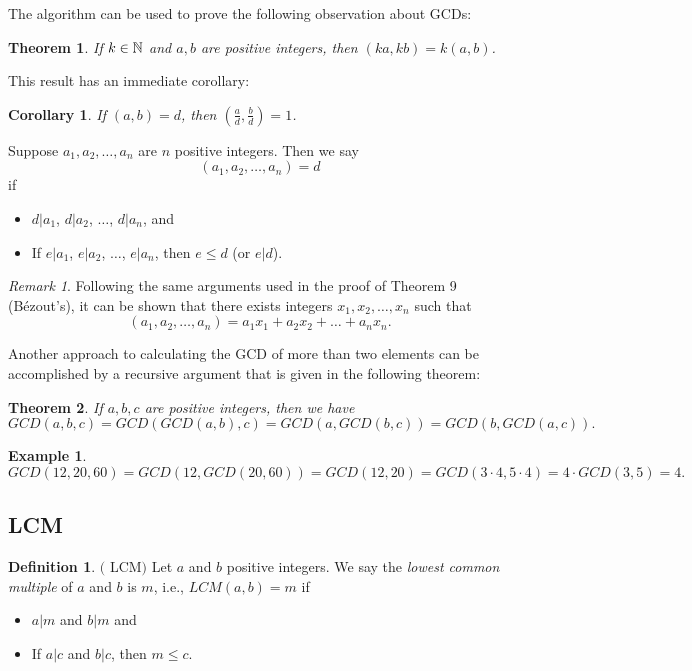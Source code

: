 \documentclass[12pt]{article}
\theoremstyle{plain}
\newtheorem{corollary}{Corollary}
\newtheorem{example}{Example}
\newtheorem{theorem}{Theorem}
\theoremstyle{definition}
\newtheorem{definition}{Definition}
\theoremstyle{remark}
\newtheorem{remark}{Remark}
\begin{document}
\bigskip
The algorithm can be used to prove the following observation about GCDs:
\begin{theorem}\label{factorout}
If $k\in \mathbb{N}$ and $a, b$ are positive integers, then $(ka, kb) = k(a,b)$.
\end{theorem}

\bigskip
This result has an immediate corollary:
\begin{corollary}
If $(a,b)=d$, then $(\frac{a}{d}, \frac{b}{d}) =1$.
\end{corollary}

\bigskip
{} Suppose $a_1, a_2, \dots, a_n$ are $n$ positive integers. Then we say
$$(a_1, a_2, \dots, a_n) = d$$ if
\begin{itemize}
    \item $d|a_1$, $d|a_2$, $\dots$, $d|a_n$, and
    \item If $e|a_1$, $e|a_2$, $\dots$, $e|a_n$, then $e\leq d$ (or $e|d$).
\end{itemize}

\begin{remark}
Following the same arguments used in the proof of Theorem 9 (B\'ezout's), it can be shown that there exists integers $x_1, x_2, \dots, x_n$ such that
$$(a_1, a_2, \dots, a_n) = a_1x_1+a_2x_2+\dots +a_nx_n.$$
\end{remark}

\bigskip
\noindent
Another approach to calculating the GCD of more than two elements can be accomplished by a recursive argument that is given in the following theorem:
\begin{theorem}
If $a, b, c$ are positive integers, then we have
$$GCD(a,b,c) = GCD(GCD(a,b),c) = GCD(a, GCD(b,c)) = GCD(b,GCD(a,c)).$$
\end{theorem}

\bigskip
\begin{example}
$GCD(12, 20, 60) = GCD(12,GCD(20,60)) = GCD(12,20)=GCD(3\cdot 4, 5\cdot 4) = 4\cdot GCD(3,5)=4.$
\end{example}

\subsection{LCM}
\begin{definition}$($ LCM$)$
Let $a$ and $b$ positive integers. We say the {\it lowest common multiple} of $a$ and $b$ is $m$, i.e., $LCM(a,b) = m$ if
\begin{itemize}
    \item $a|m$ and $b|m$ and
    \item If $a|c$ and $b|c$, then $m\leq c$.
\end{itemize}
\end{definition}
\end{document}
